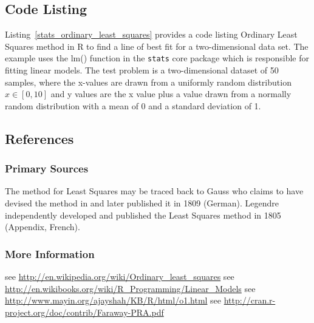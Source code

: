 \subsection{Code Listing}
Listing~\ref{stats_ordinary_least_squares} provides a code listing Ordinary Least Squares method in R to find a line of best fit for a two-dimensional data set.
The example uses the {lm()} function in the \texttt{stats} core package which is responsible for fitting linear models.
The test problem is a two-dimensional dataset of 50 samples, where the x-values are drawn from a uniformly random distribution $x \in [0,10]$ and y values are the x value plus a value drawn from a normally random distribution with a mean of 0 and a standard deviation of 1.






\subsection{References}

\subsubsection{Primary Sources}
The method for Least Squares may be traced back to Gauss who claims to have devised the method in and later published it in 1809 \cite{Gauss1809, Gauss1823} (German). Legendre independently developed and published the Least Squares method in 1805 \cite{Legendre1805} (Appendix, French).

\subsubsection{More Information}

see \url{http://en.wikipedia.org/wiki/Ordinary_least_squares}
see \url{http://en.wikibooks.org/wiki/R_Programming/Linear_Models}
see \url{http://www.mayin.org/ajayshah/KB/R/html/o1.html}
see \url{http://cran.r-project.org/doc/contrib/Faraway-PRA.pdf}

